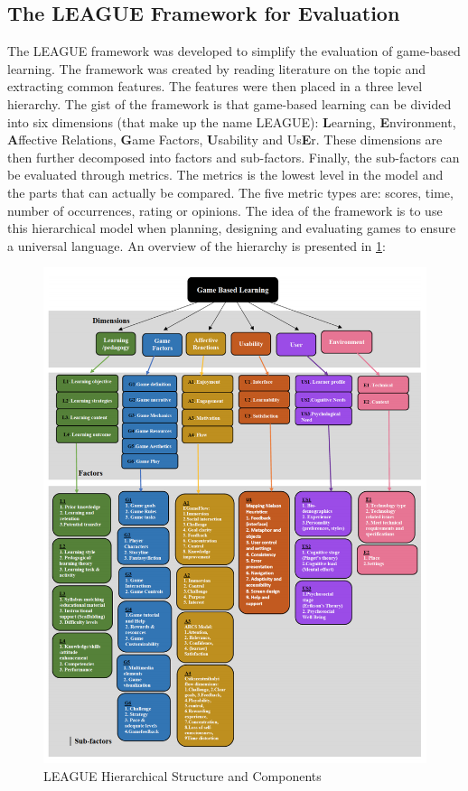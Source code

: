     \subsection{The LEAGUE Framework for Evaluation}
        \label{sec:league}
        The LEAGUE framework\cite{league} was developed to simplify the evaluation of game-based learning. The framework was created by reading literature on the topic and extracting common features. The features were then placed in a three level hierarchy. The gist of the framework is that game-based learning can be divided into six dimensions (that make up the name LEAGUE): \textbf{L}earning, \textbf{E}nvironment, \textbf{A}ffective Relations, \textbf{G}ame Factors, \textbf{U}sability and Us\textbf{E}r. These dimensions are then further decomposed into factors and sub-factors. Finally, the sub-factors can be evaluated through metrics. The metrics is the lowest level in the model and the parts that can actually be compared. The five metric types are: scores, time, number of occurrences, rating or opinions. The idea of the framework is to use this hierarchical model when planning, designing and evaluating games to ensure a universal language. An overview of the hierarchy is presented in \cref{fig:league}:
        
        \FloatBarrier
        \begin{figure}[htbp]
            \centering
            \includegraphics[width=\ImageWidth]{figures/league.PNG}
            \caption{LEAGUE Hierarchical Structure and Components}
            \label{fig:league}
        \end{figure}
        \FloatBarrier
        
